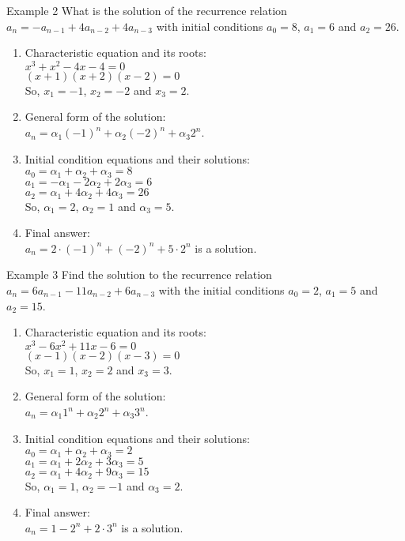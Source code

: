 \documentclass{beamer}
\begin{document}
\begin{frame}{Example 2}
    What is the solution of the recurrence relation $a_n = -a_{n-1} + 4 a_{n-2} + 4 a_{n-3}$ with initial conditions $a_0 = 8$, $a_1 = 6$ and $a_2 = 26$.
    \footnotesize
    \begin{enumerate}[<+->]
        \item Characteristic equation and its roots: \\
        $ x^3 + x^2 - 4x - 4 = 0 $ \\
        $ (x + 1)(x + 2)(x - 2) = 0 $ \\
        So, $x_1 = -1$, $x_2 = -2$ and $x_3 = 2$.
        \item General form of the solution: \\
        $ a_n = \alpha_1 (-1)^n + \alpha_2 (-2)^n + \alpha_3 2^n $.
        \item Initial condition equations and their solutions: \\
        $ a_0 = \alpha_1 + \alpha_2 + \alpha_3 = 8 $ \\
        $ a_1 = - \alpha_1 - 2 \alpha_2 + 2 \alpha_3 = 6 $ \\
        $ a_2 = \alpha_1 + 4 \alpha_2 + 4 \alpha_3 = 26 $ \\
        So, $\alpha_1 = 2$, $\alpha_2 = 1$ and $\alpha_3 = 5$.
        \item Final answer: \\
        $ a_n = 2 \cdot (-1)^n + (-2)^n + 5 \cdot 2^n $ is a solution.
    \end{enumerate}
\end{frame}

\begin{frame}{Example 3}
    Find the solution to the recurrence relation $a_n = 6a_{n-1} - 11 a_{n-2} + 6 a_{n-3}$ with the initial conditions $a_0 = 2$, $a_1 = 5$ and $a_2 = 15$.
    \footnotesize
    \begin{enumerate}[<+->]
        \item Characteristic equation and its roots: \\
        $ x^3 - 6x^2 + 11x - 6 = 0 $ \\
        $ (x - 1)(x - 2)(x - 3) = 0 $ \\
        So, $x_1 = 1$, $x_2 = 2$ and $x_3 = 3$.
        \item General form of the solution: \\
        $ a_n = \alpha_1 1^n + \alpha_2 2^n + \alpha_3 3^n $.
        \item Initial condition equations and their solutions: \\
        $ a_0 = \alpha_1 +   \alpha_2 +   \alpha_3 = 2 $ \\
        $ a_1 = \alpha_1 + 2 \alpha_2 + 3 \alpha_3 = 5 $ \\
        $ a_2 = \alpha_1 + 4 \alpha_2 + 9 \alpha_3 = 15 $ \\
        So, $\alpha_1 = 1$, $\alpha_2 = -1$ and $\alpha_3 = 2$.
        \item Final answer: \\
        $ a_n = 1 - 2^n + 2 \cdot 3^n $ is a solution.
    \end{enumerate}
\end{frame}
\end{document}
